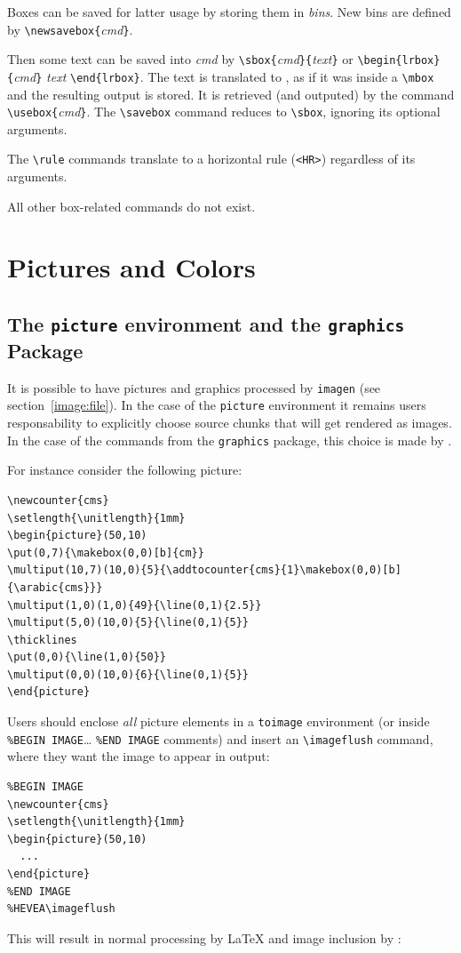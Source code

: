 Boxes can be saved for latter usage by storing them in {\em bins}.
New bins are defined by \verb+\newsavebox{+{\it cmd}\verb+}+.

Then some text can be saved into {\it cmd} by
\verb+\sbox{+{\it cmd}\verb+}{+{\it text}\verb+}+ or
\verb+\begin{lrbox}{+\textit{cmd}\verb+}+ \textit{text} \verb+\end{lrbox}+.
The text is translated to \html{}, as if it was inside a \verb+\mbox+
and the resulting output is stored.
It is retrieved (and outputed) by the command
\verb+\usebox{+{\it cmd}\verb+}+.
The \verb+\savebox+ command reduces to \verb+\sbox+, ignoring its
optional arguments.

The \verb+\rule+ commands translate to a \html{} horizontal rule
(\verb+<HR>+)  regardless of its arguments.


All other box-related commands do not exist.

\section{Pictures and Colors}

\subsection{The \texttt{picture} environment and the \texttt{graphics}
Package}

It is possible to have pictures and graphics processed by
\texttt{imagen} (see section~\ref{image:file}).
In the case of the \texttt{picture} environment
it remains users responsability to explicitly choose
source chunks that will get rendered as images.
In the case of the commands from the \texttt{graphics} package,
this choice is made by \hevea.

For instance consider the following picture:
\begin{verbatim}
\newcounter{cms}
\setlength{\unitlength}{1mm}
\begin{picture}(50,10)
\put(0,7){\makebox(0,0)[b]{cm}}
\multiput(10,7)(10,0){5}{\addtocounter{cms}{1}\makebox(0,0)[b]{\arabic{cms}}}
\multiput(1,0)(1,0){49}{\line(0,1){2.5}}
\multiput(5,0)(10,0){5}{\line(0,1){5}}
\thicklines
\put(0,0){\line(1,0){50}}
\multiput(0,0)(10,0){6}{\line(0,1){5}}
\end{picture}
\end{verbatim}
Users should enclose {\em all} picture elements in a \verb+toimage+
environment (or inside \verb+%BEGIN IMAGE+\ldots{} \verb+%END IMAGE+ %
comments) and insert an \verb+\imageflush+ command, where they want
the image to appear in \html{} output:
\begin{verbatim}
%BEGIN IMAGE
\newcounter{cms}
\setlength{\unitlength}{1mm}
\begin{picture}(50,10)
  ...
\end{picture}
%END IMAGE
%HEVEA\imageflush
\end{verbatim}
This will result in normal processing by \LaTeX{} and image inclusion
by \hevea:

